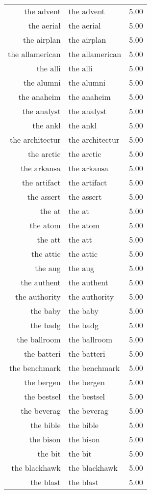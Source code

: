 \begin{table}[ht]
\begin{tabular}{rlr}
  the advent & the advent & 5.00 \\ 
  the aerial & the aerial & 5.00 \\ 
  the airplan & the airplan & 5.00 \\ 
  the allamerican & the allamerican & 5.00 \\ 
  the alli & the alli & 5.00 \\ 
  the alumni & the alumni & 5.00 \\ 
  the anaheim & the anaheim & 5.00 \\ 
  the analyst & the analyst & 5.00 \\ 
  the ankl & the ankl & 5.00 \\ 
  the architectur & the architectur & 5.00 \\ 
  the arctic & the arctic & 5.00 \\ 
  the arkansa & the arkansa & 5.00 \\ 
  the artifact & the artifact & 5.00 \\ 
  the assert & the assert & 5.00 \\ 
  the at & the at & 5.00 \\ 
  the atom & the atom & 5.00 \\ 
  the att & the att & 5.00 \\ 
  the attic & the attic & 5.00 \\ 
  the aug & the aug & 5.00 \\ 
  the authent & the authent & 5.00 \\ 
  the authority & the authority & 5.00 \\ 
  the baby & the baby & 5.00 \\ 
  the badg & the badg & 5.00 \\ 
  the ballroom & the ballroom & 5.00 \\ 
  the batteri & the batteri & 5.00 \\ 
  the benchmark & the benchmark & 5.00 \\ 
  the bergen & the bergen & 5.00 \\ 
  the bestsel & the bestsel & 5.00 \\ 
  the beverag & the beverag & 5.00 \\ 
  the bible & the bible & 5.00 \\ 
  the bison & the bison & 5.00 \\ 
  the bit & the bit & 5.00 \\ 
  the blackhawk & the blackhawk & 5.00 \\ 
  the blast & the blast & 5.00 \\ 

\end{tabular}
\end{table}
